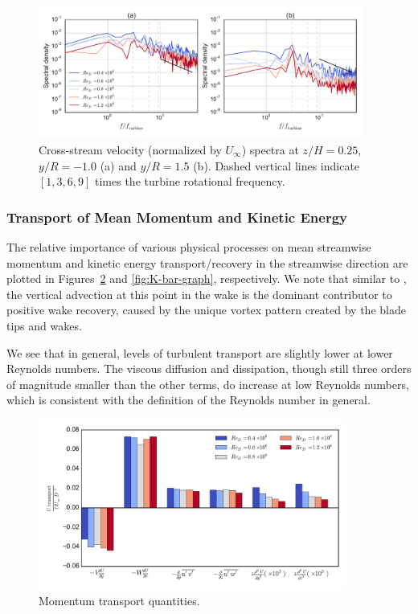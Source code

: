 \documentclass[energies,article,accept,moreauthors,pdftex,12pt,a4paper]{mdpi}
\begin{document}
\begin{figure}[ht!]
\centering
\includegraphics[width=0.95\textwidth]{figures/wake_spectra}
\caption{Cross-stream velocity (normalized by $U_\infty$) spectra at $z/H=0.25$, 
$y/R=-1.0$ (a) and $y/R=1.5$ (b). Dashed vertical
lines indicate $[1, 3, 6, 9]$ times the turbine rotational frequency.}
\label{fig:wake-spectra}
\end{figure}



\subsubsection{Transport of Mean Momentum and Kinetic Energy}

The relative importance of various physical processes on mean streamwise
momentum and kinetic energy transport/recovery in the streamwise direction are
plotted in Figures~\ref{fig:mom-bar-graph} and \ref{fig:K-bar-graph},
respectively. We note that similar to \cite{Bachant2015-JoT}, the vertical
advection at this point in the wake is the dominant contributor to positive wake
recovery, caused by the unique vortex pattern created by the blade tips and
wakes.

We see that in general, levels of turbulent transport are slightly lower at
lower Reynolds numbers. The viscous diffusion and dissipation, though still
three orders of magnitude smaller than the other terms, do increase at low
Reynolds numbers, which is consistent with the definition of the Reynolds number
in general.


\begin{figure}[ht!]
\centering
\includegraphics[width=0.9\textwidth]{figures/mom_bar_graph}
\caption{Momentum transport quantities.}
\label{fig:mom-bar-graph}
\end{figure}
\end{document}
